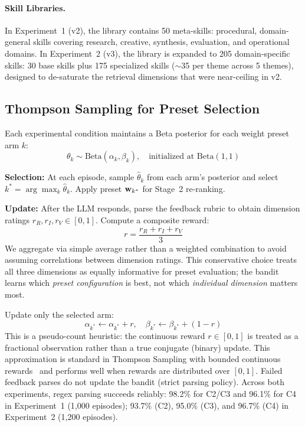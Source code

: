 \paragraph{Skill Libraries.}
In Experiment~1 (v2), the library contains 50 meta-skills: procedural, domain-general skills covering research, creative, synthesis, evaluation, and operational domains.
In Experiment~2 (v3), the library is expanded to 205 domain-specific skills: 30 base skills plus 175 specialized skills (${\sim}$35 per theme across 5 themes), designed to de-saturate the retrieval dimensions that were near-ceiling in v2.

\subsection{Thompson Sampling for Preset Selection}
\label{sec:ts}

Each experimental condition maintains a Beta posterior for each weight preset arm $k$:
\begin{equation}
\theta_k \sim \text{Beta}(\alpha_k, \beta_k), \quad \text{initialized at } \text{Beta}(1, 1)
\end{equation}

\textbf{Selection:} At each episode, sample $\hat{\theta}_k$ from each arm's posterior and select $k^* = \arg\max_k \hat{\theta}_k$.
Apply preset $\mathbf{w}_{k^*}$ for Stage~2 re-ranking.

\textbf{Update:} After the LLM responds, parse the feedback rubric to obtain dimension ratings $r_R, r_I, r_V \in [0, 1]$.
Compute a composite reward:
\begin{equation}
r = \frac{r_R + r_I + r_V}{3}
\end{equation}
We aggregate via simple average rather than a weighted combination to avoid assuming correlations between dimension ratings.
This conservative choice treats all three dimensions as equally informative for preset evaluation; the bandit learns which \emph{preset configuration} is best, not which \emph{individual dimension} matters most.

Update only the selected arm:
\begin{equation}
\alpha_{k^*} \leftarrow \alpha_{k^*} + r, \quad \beta_{k^*} \leftarrow \beta_{k^*} + (1 - r)
\end{equation}
This is a pseudo-count heuristic: the continuous reward $r \in [0,1]$ is treated as a fractional observation rather than a true conjugate (binary) update.
This approximation is standard in Thompson Sampling with bounded continuous rewards~\citep{agrawal2013thompson} and performs well when rewards are distributed over $[0,1]$.
Failed feedback parses do not update the bandit (strict parsing policy).
Across both experiments, regex parsing succeeds reliably: 98.2\% for C2/C3 and 96.1\% for C4 in Experiment~1 (1,000 episodes); 93.7\% (C2), 95.0\% (C3), and 96.7\% (C4) in Experiment~2 (1,200 episodes).

